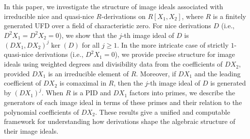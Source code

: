 \documentclass[a4paper,12pt]{article}
\begin{document}
{	\noindent
	In this paper, we investigate the structure of image ideals associated with irreducible nice and quasi-nice $R$-derivations on $R[X_1, X_2]$, where $R$ is a finitely generated UFD  over a field of characteristic zero. For nice derivations $D$ (i.e., $D^2X_1 = D^2X_2 = 0$), we show that the $j$-th image ideal of $D$ is $(DX_1, DX_2)^j \ker(D)$ for all $j\geqslant 1$. In the more intricate case of strictly $1$-quasi-nice derivations (i.e., $D^2X_1=0$), we provide precise structure for image ideals using weighted degrees and divisibility data from the coefficients of $DX_2$, provided $DX_1$ is an irreducible element of $R$. Moreover, if $DX_1$ and the leading coefficient of $DX_2$ is comaximal in $R$, then the $j$-th image ideal of $D$ is generated by $(DX_1)^j$.  When $R$ is a PID and $DX_1$ factors into primes, we describe the generators of each image ideal in terms of these primes and their relation to the polynomial coefficients of $DX_2$. These results give a unified and computable framework for understanding how derivations shape the algebraic structure of their image ideals.}	
\end{document}
